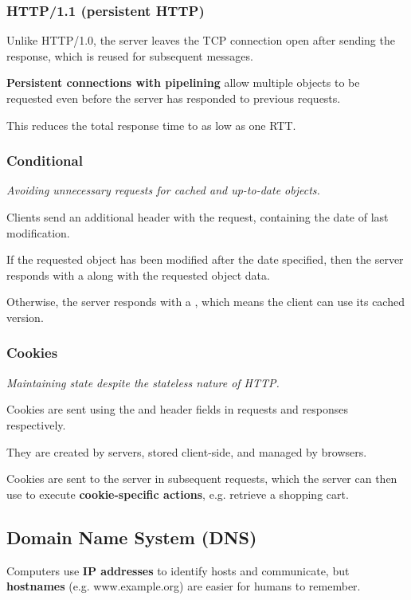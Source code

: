 \subsubsection{HTTP/1.1 (persistent HTTP)}
Unlike HTTP/1.0, the server leaves the TCP connection open after sending the response, which is reused for subsequent messages.

\textbf{Persistent connections with pipelining} allow multiple objects to be requested even before the server
has responded to previous requests.

This reduces the total response time to as low as one RTT.

\subsubsection{Conditional }
\emph{Avoiding unnecessary requests for cached and up-to-date objects.}

Clients send an additional  header with the request, containing the date of last modification.

If the requested object has been modified after the date specified, then the server responds with a  along
with the requested object data.

Otherwise, the server responds with a , which means the client can use its cached version.

\subsubsection{Cookies}
\emph{Maintaining state despite the stateless nature of HTTP.}

Cookies are sent using the  and  header fields in requests and responses respectively.

They are created by servers, stored client-side, and managed by browsers.

Cookies are sent to the server in subsequent requests,
which the server can then use to execute \textbf{cookie-specific actions}, e.g. retrieve a shopping cart.


\subsection{Domain Name System (DNS)}
Computers use \textbf{IP addresses} to identify hosts and communicate, 
but \textbf{hostnames} (e.g. www.example.org) are easier for humans to remember.

